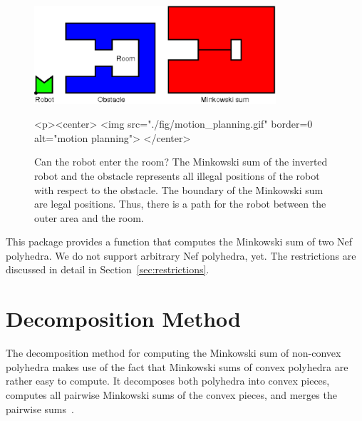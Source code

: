 \begin{figure}
  \begin{ccTexOnly}
    \begin{center}
      \includegraphics[width=0.8\textwidth]{Minkowski_sum_3/fig/motion_planning}
    \end{center}
  \end{ccTexOnly}
  \begin{ccHtmlOnly}
    <p><center>
    <img src="./fig/motion_planning.gif" border=0 alt="motion planning">
    </center>
  \end{ccHtmlOnly}
  \caption{Can the robot enter the room? The Minkowski sum of the inverted
           robot and the obstacle represents all illegal positions of the 
           robot with respect to the obstacle. 
           The boundary of the Minkowski sum are legal positions. Thus, there
           is a path for the robot between the outer area and the room.}
  \label{fig:motionPlanning}
\end{figure}

This package provides a function  that computes
the Minkowski sum of two Nef polyhedra. We do not support arbitrary
Nef polyhedra, yet. The restrictions are discussed in detail in
Section~\ref{sec:restrictions}.

\section{Decomposition Method}

The decomposition method for computing the Minkowski sum of non-convex
polyhedra makes use of the fact that Minkowski sums of convex
polyhedra are rather easy to compute. It decomposes both polyhedra
into convex pieces, computes all pairwise Minkowski sums of the convex
pieces, and merges the pairwise sums~\cite{bkos-cgaa-97}.


